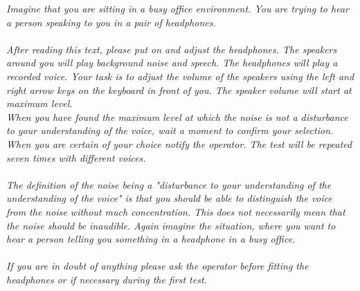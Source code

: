 \textit{Imagine that you are sitting in a busy office environment. You are trying to hear a person speaking to you in a pair of headphones. \\\\
After reading this text, please put on and adjust the headphones. The speakers around you will play background noise and speech. The headphones will play a recorded voice. Your task is to adjust the volume of the speakers using the left and right arrow keys on the keyboard in front of you. The speaker volume will start at maximum level. \\
When you have found the maximum level at which the noise is not a disturbance to your understanding of the voice, wait a moment to confirm your selection. When you are certain of your choice notify the operator. 
The test will be repeated seven times with different voices. \\\\
The definition of the noise being a "disturbance to your understanding of the understanding of the voice" is that you should be able to distinguish the voice from the noise without much concentration. This does not necessarily mean that the noise should be inaudible. Again imagine the situation, where you want to hear a person telling you something in a headphone in a busy office.\\\\ 
If you are in doubt of anything please ask the operator before fitting the headphones or if necessary during the first test.}


